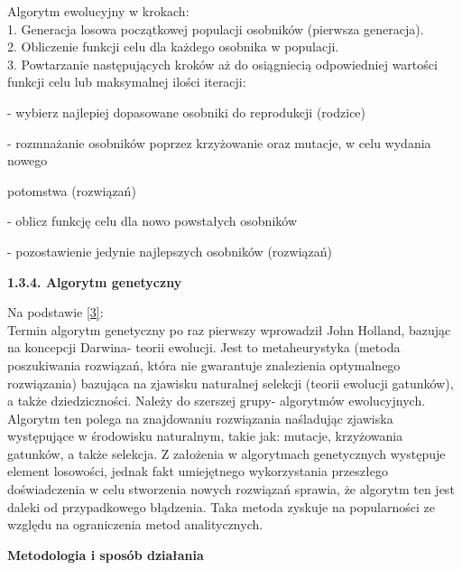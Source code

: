 \documentclass[a4paper, twoside, 12pt, justified]{article}
\begin{document}
	Algorytm ewolucyjny w krokach:\\
	1. Generacja losowa początkowej populacji osobników (pierwsza generacja).\\
	2. Obliczenie funkcji celu dla każdego osobnika w populacji.\\
	3. Powtarzanie następujących kroków aż do osiągniecią odpowiedniej wartości funkcji celu lub maksymalnej ilości iteracji:
	
	\hspace{5mm}- wybierz najlepiej dopasowane osobniki do reprodukcji (rodzice)
	
	\hspace{5mm}- rozmnażanie osobników poprzez krzyżowanie oraz mutacje, w celu wydania nowego 
	
	\hspace{6mm} potomstwa (rozwiązań)
	
	\hspace{5mm}- oblicz funkcję celu dla nowo powstałych osobników
	
	\hspace{5mm}- pozostawienie jedynie najlepszych osobników (rozwiązań)\\
	
	\newpage
	
	\begin{large}
		\textbf{1.3.4. Algorytm genetyczny}
	\end{large}
	\vspace{5mm} %
	
	Na podstawie \hyperlink{ag}{[3]}:\\
	Termin algorytm genetyczny po raz pierwszy wprowadził John Holland, bazując na koncepcji Darwina- teorii ewolucji. Jest to metaheurystyka (metoda poszukiwania rozwiązań, która nie gwarantuje znalezienia optymalnego rozwiązania) bazująca na zjawisku naturalnej selekcji (teorii ewolucji gatunków), a także dziedziczności. Należy do szerszej grupy- algorytmów ewolucyjnych. Algorytm ten polega na znajdowaniu rozwiązania naśladując zjawiska występujące w środowisku naturalnym, takie jak: mutacje, krzyżowania gatunków, a także selekcja. Z założenia w algorytmach genetycznych występuje element losowości, jednak fakt umiejętnego wykorzystania przeszłego doświadczenia w celu stworzenia nowych rozwiązań sprawia, że algorytm ten jest daleki od przypadkowego błądzenia. Taka metoda zyskuje na popularności ze względu na ograniczenia metod analitycznych.\\
	
	\begin{large}
		\begin{center}
			\textbf{Metodologia i sposób działania}
		\end{center}
	\end{large}
	
\end{document}
